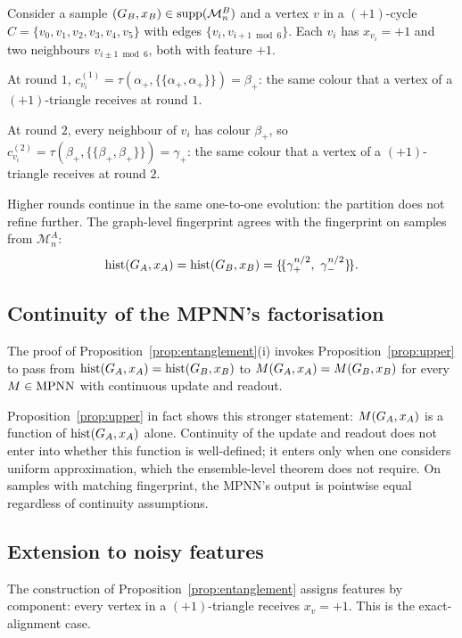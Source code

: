 Consider a sample $(G_B, x_B) \in \mathrm{supp}(\mathcal{M}_n^B)$
and a vertex $v$ in a $(+1)$-cycle $C = \{v_0, v_1, v_2, v_3, v_4,
v_5\}$ with edges $\{v_i, v_{i+1 \bmod 6}\}$. Each $v_i$ has
$x_{v_i} = +1$ and two neighbours $v_{i \pm 1 \bmod 6}$, both with
feature $+1$.

At round $1$, $c_{v_i}^{(1)} = \tau(\alpha_+, \{\!\{\alpha_+,
\alpha_+\}\!\}) = \beta_+$: the same colour that a vertex of a
$(+1)$-triangle receives at round $1$.

At round $2$, every neighbour of $v_i$ has colour $\beta_+$, so
$c_{v_i}^{(2)} = \tau(\beta_+, \{\!\{\beta_+, \beta_+\}\!\}) =
\gamma_+$: the same colour that a vertex of a $(+1)$-triangle
receives at round $2$.

Higher rounds continue in the same one-to-one evolution: the partition
does not refine further. The graph-level fingerprint agrees with the
fingerprint on samples from $\mathcal{M}_n^A$:
\[
\mathrm{hist}(\gph_A, x_A) = \mathrm{hist}(\gph_B, x_B) = \{\!\{\gamma_+^{n/2},\ \gamma_-^{n/2}\}\!\}.
\]

\subsection{Continuity of the MPNN's factorisation}

The proof of Proposition~\ref{prop:entanglement}(i) invokes Proposition~\ref{prop:upper} to
pass from $\mathrm{hist}(G_A, x_A) = \mathrm{hist}(G_B, x_B)$
to $M(G_A, x_A) = M(G_B, x_B)$ for every $M \in \mathrm{MPNN}$ with
continuous update and readout.

Proposition~\ref{prop:upper} in fact shows this stronger statement: $M(G_A,
x_A)$ is a function of $\mathrm{hist}(G_A, x_A)$ alone.
Continuity of the update and readout does not enter into whether
this function is well-defined; it enters only when one considers
uniform approximation, which the ensemble-level theorem does not
require. On samples with matching fingerprint, the MPNN's output is
pointwise equal regardless of continuity assumptions.

\subsection{Extension to noisy features}

The construction of Proposition~\ref{prop:entanglement} assigns features by
component: every vertex in a $(+1)$-triangle receives $x_v = +1$.
This is the exact-alignment case.

